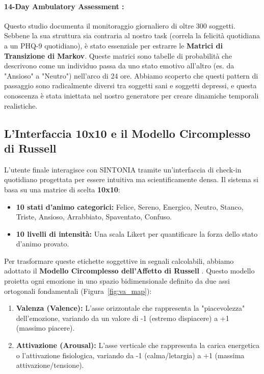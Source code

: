 \paragraph{14-Day Ambulatory Assessment \cite{kaggle_14day_depression}:} 
Questo studio documenta il monitoraggio giornaliero di oltre 300 soggetti. Sebbene la sua struttura sia contraria al nostro task (correla la felicità quotidiana a un PHQ-9 quotidiano), è stato essenziale per estrarre le \textbf{Matrici di Transizione di Markov}. Queste matrici sono tabelle di probabilità che descrivono come un individuo passa da uno stato emotivo all'altro (es. da "Ansioso" a "Neutro") nell'arco di 24 ore. Abbiamo scoperto che questi pattern di passaggio sono radicalmente diversi tra soggetti sani e soggetti depressi, e questa conoscenza è stata iniettata nel nostro generatore per creare dinamiche temporali realistiche.
\subsection{L'Interfaccia 10x10 e il Modello Circomplesso di Russell}
\label{subsec:russell_mapping}

L'utente finale interagisce con SINTONIA tramite un'interfaccia di check-in quotidiano progettata per essere intuitiva ma scientificamente densa. Il sistema si basa su una matrice di scelta \textbf{10x10}:
\begin{itemize}
    \item \textbf{10 stati d'animo categorici:} Felice, Sereno, Energico, Neutro, Stanco, Triste, Ansioso, Arrabbiato, Spaventato, Confuso.
    \item \textbf{10 livelli di intensità:} Una scala Likert per quantificare la forza dello stato d'animo provato.
\end{itemize}

Per trasformare queste etichette soggettive in segnali calcolabili, abbiamo adottato il \textbf{Modello Circomplesso dell'Affetto di Russell} \cite{russell1980circumplex}. Questo modello proietta ogni emozione in uno spazio bidimensionale definito da due assi ortogonali fondamentali (Figura~\ref{fig:va_map}):
\begin{enumerate}
    \item \textbf{Valenza (Valence):} L'asse orizzontale che rappresenta la "piacevolezza" dell'emozione, variando da un valore di -1 (estremo dispiacere) a +1 (massimo piacere).
    \item \textbf{Attivazione (Arousal):} L'asse verticale che rappresenta la carica energetica o l'attivazione fisiologica, variando da -1 (calma/letargia) a +1 (massima attivazione/tensione).
\end{enumerate}

